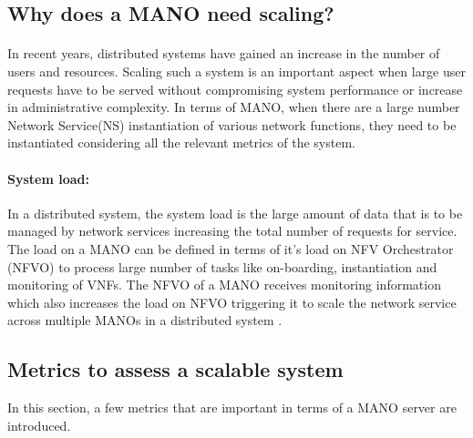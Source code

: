 \subsection{Why does a MANO need scaling?}
\paragraph{}
In recent years, distributed systems have gained an increase in the number of users and resources. Scaling such a system is an important aspect when large user requests have to be served without compromising system performance or increase in administrative complexity. In terms of MANO, when there are a large number Network Service(NS) instantiation of various network functions, they need to be instantiated considering all the relevant metrics of the system.

\paragraph{System load:}
In a distributed system, the system load is the large amount of data that is to be managed by network services increasing the total number of requests for service.
The load on a MANO can be defined in terms of it's load on NFV Orchestrator (NFVO) to process large number of tasks like on-boarding, instantiation and monitoring of VNFs. The NFVO of a MANO receives monitoring information which also increases the load on NFVO triggering it to scale the network service across multiple MANOs in a distributed system \cite{soenen2017optimising}.


\subsection{Metrics to assess a scalable system}
\label{Metrics}
In this section, a few metrics that are important in terms of a MANO server are introduced.

